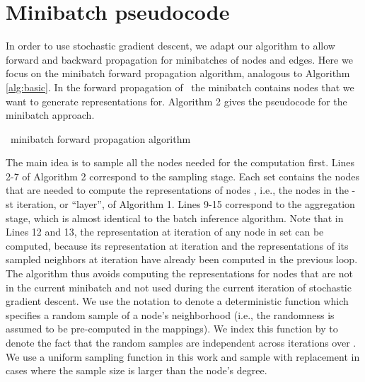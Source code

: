 \section{Minibatch pseudocode}\label{inductive:sec:minibatch}

In order to use stochastic gradient descent, we adapt our algorithm to allow forward and backward
propagation for minibatches of nodes and edges. 
Here we focus on the minibatch forward propagation
algorithm, analogous to Algorithm \ref{alg:basic}.
In the forward propagation of \name\, the minibatch  contains nodes that we want to generate representations for. 
Algorithm 2 gives the pseudocode for the minibatch approach. 

\setcounter{algocf}{1}
\begin{algorithm}
\caption{\name\ minibatch forward propagation algorithm}
    \BlankLine
         \;
        \For{}{
             \;
            \For{}{
                \;
            }
    	}
         \;
        \For{}{
            \For{}{
    	        \;
    	        \;
    	         \;
            }
        }
      
\end{algorithm}

The main idea is to sample all the nodes needed for the computation first. 
Lines 2-7 of Algorithm 2 correspond to the sampling stage. 
Each set  contains the nodes that are needed to compute the representations of
nodes , i.e., the nodes in the -st iteration, or ``layer'', of Algorithm 1.
Lines 9-15 correspond to the aggregation stage, which is almost identical to the batch inference
algorithm. 
Note that in Lines 12 and 13, the representation at iteration  of any node in set  can be computed, because its representation at iteration   and the representations of its sampled neighbors at iteration  have already been computed
in the previous loop.
The algorithm thus avoids computing the representations for nodes that are not in the current
minibatch and not used during the current iteration of stochastic gradient descent.
We use the notation  to denote a deterministic function which specifies a random sample of a node's neighborhood (i.e., the randomness is assumed to be pre-computed in the mappings).
We index this function by  to denote the fact that the random samples are independent across iterations over .
We use a uniform sampling function in this work and sample with replacement in cases where the sample size is larger than the node's degree. 

